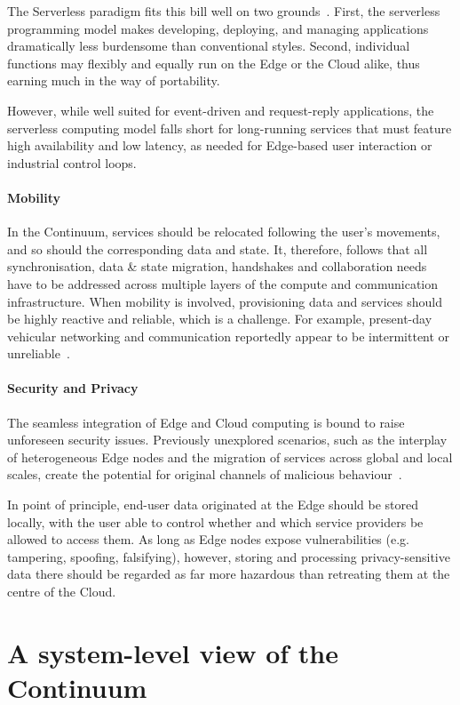 The Serverless paradigm fits this bill well on two grounds~\cite{yi2017lavea}. First, the serverless programming model makes developing, deploying, and managing applications dramatically less burdensome than conventional styles.
Second, individual functions may flexibly and equally run on the Edge or the Cloud alike, thus earning much in the way of portability.

However, while well suited for event-driven and request-reply applications, the serverless computing model falls short for long-running services that must feature high availability and low latency, as needed for Edge-based user interaction or industrial control loops.

\paragraph{Mobility}
In the Continuum, services should be relocated following the user's movements, and so should the corresponding data and state. 
It, therefore, follows that all synchronisation, data \& state migration, handshakes and collaboration needs have to be addressed across multiple layers of the compute and communication infrastructure.
When mobility is involved, provisioning data and services should be highly reactive and reliable, which is a challenge. 
For example, present-day vehicular networking and communication reportedly appear to be intermittent or unreliable~\cite{he2014developing}.

\paragraph{Security and Privacy}

The seamless integration of Edge and Cloud computing is bound to raise unforeseen security issues. Previously unexplored scenarios, such as the interplay of heterogeneous Edge nodes and the migration of services across global and local scales, create the potential for original channels of malicious behaviour~\cite{yu2017survey}.

In point of principle, end-user data originated at the Edge should be stored locally, with the user able to control whether and which service providers be allowed to access them. 
As long as Edge nodes expose vulnerabilities (e.g. tampering, spoofing, falsifying), however, storing and processing privacy-sensitive data there should be regarded as far more hazardous than retreating them at the centre of the Cloud.

\section{A system-level view of the Continuum}
\label{sec:technicals}

